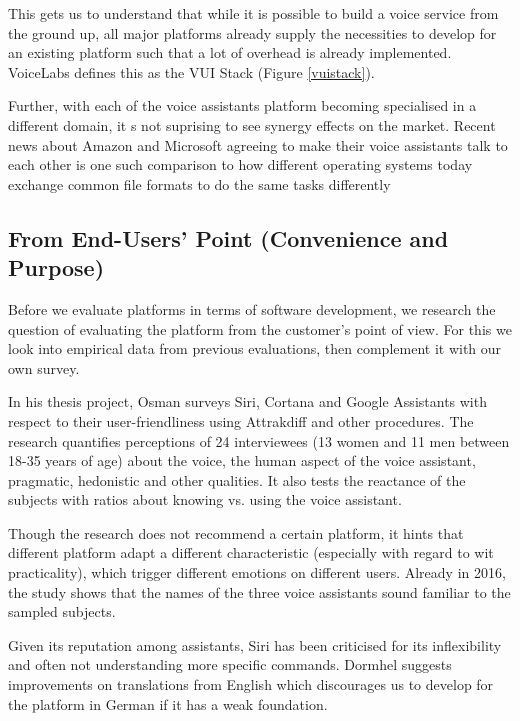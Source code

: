 This gets us to understand that while it is possible to build a voice service from the ground up, all major platforms already supply the necessities to develop for an existing platform such that a lot of overhead is already implemented. VoiceLabs defines this as the VUI Stack (Figure \ref{vuistack}).

Further, with each of the voice assistants platform becoming specialised in a different domain, %
it s not suprising to see synergy effects on the market. Recent news about
Amazon and Microsoft agreeing to make their voice assistants talk to each other \cite{amznMicrosoft} is one such comparison to how different operating systems today exchange common file formats to do the same tasks differently\\


\subsection*{From End-Users' Point (Convenience and Purpose)}

Before we evaluate platforms in terms of software development, we research the question of evaluating the platform from the customer's point of view. For this we look into empirical data from previous evaluations, then complement it with our own survey. 

In his thesis project, Osman \cite{osman:siri} surveys Siri, Cortana and Google Assistants with respect to their user-friendliness using Attrakdiff and other procedures. The research quantifies perceptions of 24 interviewees (13 women and 11 men between 18-35 years of age) about the voice,  the human aspect of the voice assistant, pragmatic, hedonistic and other qualities. It also tests the reactance of the subjects with ratios about knowing vs. using the voice assistant.

Though the research does not recommend a certain platform, it hints that different platform adapt a different characteristic (especially with regard to wit practicality), which trigger different emotions on different users. Already in 2016, the study shows that the names of the three voice assistants sound familiar to the sampled subjects.

Given its reputation among assistants, Siri has been criticised for its inflexibility and often not understanding more specific commands. Dormhel suggests improvements on translations from English \cite{dormhell:siri} which discourages us to develop for the platform in German if it has a weak foundation.

